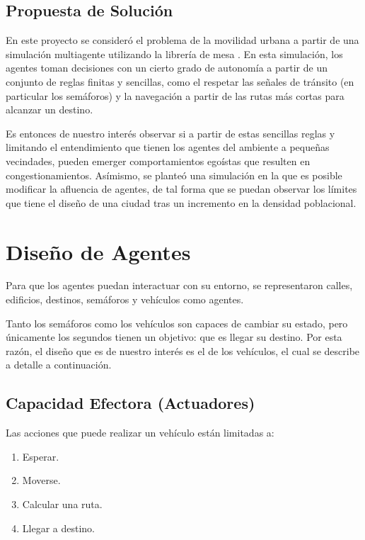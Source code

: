 \documentclass[twoside,11pt]{article}
\begin{document}
\subsection{Propuesta de Solución}
En este proyecto se consideró el problema de la movilidad urbana a partir de una simulación
multiagente utilizando la librería de mesa \cite[]{python-mesa-2020}. En esta simulación,
los agentes toman decisiones con un cierto grado de autonomía a partir de un conjunto de reglas
finitas y sencillas, como el respetar las señales de tránsito (en particular los semáforos) y 
la navegación a partir de las rutas más cortas para alcanzar un destino.

Es entonces de nuestro interés observar si a partir de estas sencillas reglas y limitando el entendimiento 
que tienen los agentes del ambiente a pequeñas vecindades, pueden emerger comportamientos egoístas que resulten
en congestionamientos. Asímismo, se planteó una simulación en la que es posible modificar la afluencia de agentes,
de tal forma que se puedan observar los límites que tiene el diseño de una ciudad tras un incremento en la densidad
poblacional.

\section{Diseño de Agentes}

Para que los agentes puedan interactuar con su entorno, se representaron calles, edificios, destinos, semáforos y vehículos
como agentes.

Tanto los semáforos como los vehículos son capaces de cambiar su estado, pero únicamente los segundos tienen
un objetivo: que es llegar su destino. Por esta razón, el diseño que es de nuestro interés es el de los vehículos, el cual
se describe a detalle a continuación.

\subsection{Capacidad Efectora (Actuadores)}

Las acciones que puede realizar un vehículo están limitadas a:

\begin{enumerate}
    \item Esperar.
    
    \item Moverse.

    \item Calcular una ruta.

    \item Llegar a destino.
\end{enumerate}
\end{document}
